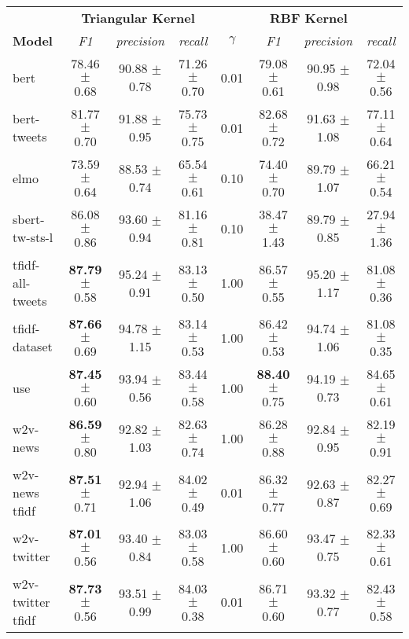 \begin{tabular}{|l|ccc|cccc|}
\hline
\rowcolor{gray!25}
                           &\multicolumn{3}{c}{\textbf{Triangular Kernel}}&\multicolumn{4}{|c|}{\textbf{RBF Kernel}}\\
\cline{2-8}\textbf{Model}&\textit{F1} &  \textit{precision} &  \textit{recall} & $\gamma$ &       \textit{F1} &\textit{precision} &\textit{recall} \\
\hline
             bert  &  78.46 $\pm$ 0.68 &   90.88 $\pm$ 0.78 &  71.26 $\pm$ 0.70 &     0.01 &  79.08 $\pm$ 0.61 &   90.95 $\pm$ 0.98 &  72.04 $\pm$ 0.56 \\
      bert-tweets  &  81.77 $\pm$ 0.70 &   91.88 $\pm$ 0.95 &  75.73 $\pm$ 0.75 &     0.01 &  82.68 $\pm$ 0.72 &   91.63 $\pm$ 1.08 &  77.11 $\pm$ 0.64 \\
             elmo  &  73.59 $\pm$ 0.64 &   88.53 $\pm$ 0.74 &  65.54 $\pm$ 0.61 &     0.10 &    74.40 $\pm$ 0.70 &   89.79 $\pm$ 1.07 &  66.21 $\pm$ 0.54 \\
   sbert-tw-sts-l  &  86.08 $\pm$ 0.86 &   93.60 $\pm$ 0.94 &  81.16 $\pm$ 0.81 &     0.10 &  38.47 $\pm$ 1.43 &   89.79 $\pm$ 0.85 &  27.94 $\pm$ 1.36 \\
 tfidf-all-tweets  &  \textbf{87.79} $\pm$ 0.58 &   95.24 $\pm$ 0.91 &  83.13 $\pm$ 0.50 &     1.00 &  86.57 $\pm$ 0.55 &    95.20 $\pm$ 1.17 &  81.08 $\pm$ 0.36 \\
    tfidf-dataset  &  \textbf{87.66} $\pm$ 0.69 &   94.78 $\pm$ 1.15 &  83.14 $\pm$ 0.53 &     1.00 &  86.42 $\pm$ 0.53 &   94.74 $\pm$ 1.06 &  81.08 $\pm$ 0.35 \\
              use  &  \textbf{87.45} $\pm$ 0.60 &   93.94 $\pm$ 0.56 &  83.44 $\pm$ 0.58 &     1.00 &  \textbf{88.40} $\pm$ 0.75 &   94.19 $\pm$ 0.73 &  84.65 $\pm$ 0.61 \\
         w2v-news  &  \textbf{86.59} $\pm$ 0.80 &   92.82 $\pm$ 1.03 &  82.63 $\pm$ 0.74 &     1.00 &  86.28 $\pm$ 0.88 &   92.84 $\pm$ 0.95 &  82.19 $\pm$ 0.91 \\
    w2v-news tfidf &  \textbf{87.51} $\pm$ 0.71 &   92.94 $\pm$ 1.06 &  84.02 $\pm$ 0.49 &     0.01 &  86.32 $\pm$ 0.77 &   92.63 $\pm$ 0.87 &  82.27 $\pm$ 0.69 \\
      w2v-twitter  &  \textbf{87.01} $\pm$ 0.56 &   93.40 $\pm$ 0.84 &  83.03 $\pm$ 0.58 &     1.00 &  86.60 $\pm$ 0.60 &   93.47 $\pm$ 0.75 &  82.33 $\pm$ 0.61 \\
 w2v-twitter tfidf &  \textbf{87.73} $\pm$ 0.56 &   93.51 $\pm$ 0.99 &  84.03 $\pm$ 0.38 &     0.01 &  86.71 $\pm$ 0.60 &   93.32 $\pm$ 0.77 &  82.43 $\pm$ 0.58 \\
\hline
\end{tabular}
